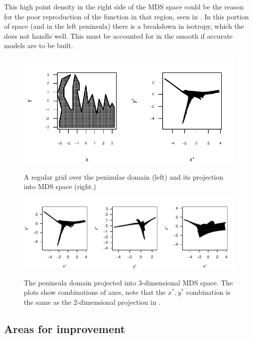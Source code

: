 This high point density in the right side of the MDS space could be the reason for the poor reproduction of the function in that region, seen in . In this portion of space (and in the left peninsula) there is a breakdown in isotropy, which the \tprs does not handle well. This must be accounted for in the smooth if accurate models are to be built.

\begin{figure}
\centering
\includegraphics[width=4.5in]{mds/figs/wt2-2d-proj.pdf} \\
\caption{A regular grid over the peninulae domain (left) and its projection into MDS space (right.)}
\label{wt2-2d-proj}
\end{figure}

\begin{figure}
\centering
\includegraphics[width=6in]{mds/figs/wt2-3d-proj.pdf} \\
\caption{The peninsula domain projected into 3-dimensional MDS space. The plots show combinations of axes, note that the $x^*,y^*$ combination is the same as the 2-dimensional projection in .}
\label{wt2-3d-proj}
\end{figure}

\subsection{Areas for improvement}

